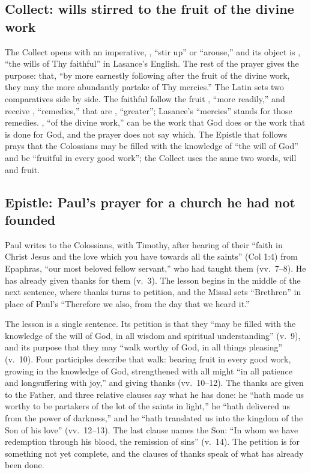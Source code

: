 \subsection{Collect: wills stirred to the fruit of the divine work}
\label{sec:element-collect}

The Collect opens with an imperative, , ``stir up'' or
``arouse,'' and its object is , ``the wills
of Thy faithful'' in Lasance's English. The rest of the prayer gives the
purpose: that, ``by more earnestly following after the fruit of the divine
work, they may the more abundantly partake of Thy mercies.'' The Latin sets
two comparatives side by side. The faithful follow the fruit
, ``more readily,'' and receive , ``remedies,''
that are , ``greater''; Lasance's ``mercies'' stands for those
remedies. , ``of the divine work,'' can be the work that
God does or the work that is done for God, and the prayer does not say
which. The Epistle that follows prays that the Colossians may be
filled with the knowledge of ``the will of God'' and be ``fruitful in every
good work''; the Collect uses the same two words, will and fruit.

\subsection{Epistle: Paul's prayer for a church he had not founded}
\label{sec:element-epistle}

Paul writes to the Colossians, with Timothy, after hearing of their ``faith in
Christ Jesus and the love which you have towards all the saints'' (Col 1:4)
from Epaphras, ``our most beloved fellow servant,'' who had taught them
(vv.~7--8). He has already given thanks for them (v.~3). The lesson begins in
the middle of the next sentence, where thanks turns to petition, and the
Missal sets ``Brethren'' in place of Paul's ``Therefore we also, from the day
that we heard it.''

The lesson is a single sentence. Its petition is that they ``may be filled with
the knowledge of the will of God, in all wisdom and spiritual understanding''
(v.~9), and its purpose that they may ``walk worthy of God, in all things
pleasing'' (v.~10). Four participles describe that walk: bearing fruit in
every good work, growing in the knowledge of God, strengthened with all might
``in all patience and longsuffering with joy,'' and giving thanks (vv.~10--12).
The thanks are given to the Father, and three relative clauses say what he has
done: he ``hath made us worthy to be partakers of the lot of the saints in
light,'' he ``hath delivered us from the power of darkness,'' and he ``hath
translated us into the kingdom of the Son of his love'' (vv.~12--13). The last
clause names the Son: ``In whom we have redemption through his blood, the
remission of sins'' (v.~14). The petition is for something not yet complete,
and the clauses of thanks speak of what has already been done.


